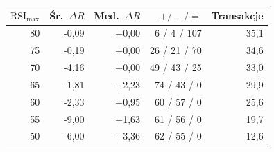 \setlength{\tabcolsep}{4pt}
\begin{tabular}{@{}rrrrr@{}}
\toprule
$\text{RSI}_{\max}$ & Śr.~$\Delta R$ & Med.~$\Delta R$ & $+ / - / =$ & Transakcje \\
\midrule
80 & -0,09 & +0,00 & 6 / 4 / 107 & 35,1 \\
75 & -0,19 & +0,00 & 26 / 21 / 70 & 34,6 \\
70 & -4,16 & +0,00 & 49 / 43 / 25 & 33,0 \\
65 & -1,81 & +2,23 & 74 / 43 / 0 & 29,9 \\
60 & -2,33 & +0,95 & 60 / 57 / 0 & 25,6 \\
55 & -9,00 & +1,63 & 61 / 56 / 0 & 19,7 \\
50 & -6,00 & +3,36 & 62 / 55 / 0 & 12,6 \\
\bottomrule
\end{tabular}
